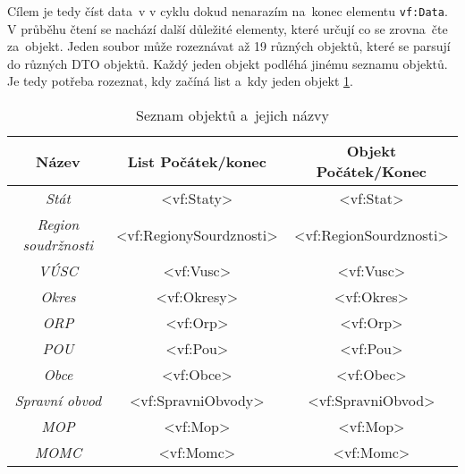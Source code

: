 Cílem je tedy číst data~v v cyklu dokud nenarazím na~konec elementu \texttt{vf:Data}.
V průběhu čtení se nachází další důležité elementy, které určují co se zrovna~čte za~objekt.
Jeden soubor může rozeznávat až 19 různých objektů, které se parsují do různých DTO objektů.
Každý jeden objekt podléhá jinému seznamu objektů.
Je tedy potřeba rozeznat, kdy začíná list a~kdy jeden objekt \ref{tab:seznamObjektu}.
\begin{table}[!h]
    \label{tab:seznamObjektu}
    \centering
    \caption{Seznam objektů a~jejich názvy}
    \begin{tabular}{|c|c|c|}
    \hline
    \textbf{Název}                       & \textbf{List Počátek/konec}                    & \textbf{Objekt Počátek/Konec}                 \\ \hline
    \textit{Stát}                        & \textless{}vf:Staty\textgreater{}              & \textless{}vf:Stat\textgreater{}              \\ \hline
    \textit{Region soudržnosti}          & \textless{}vf:RegionySourdznosti\textgreater{} & \textless{}vf:RegionSourdznosti\textgreater{} \\ \hline
    \textit{VÚSC}                        & \textless{}vf:Vusc\textgreater{}               & \textless{}vf:Vusc\textgreater{}              \\ \hline
    \textit{Okres}                       & \textless{}vf:Okresy\textgreater{}             & \textless{}vf:Okres\textgreater{}             \\ \hline
    \textit{ORP}                         & \textless{}vf:Orp\textgreater{}                & \textless{}vf:Orp\textgreater{}               \\ \hline
    \textit{POU}                         & \textless{}vf:Pou\textgreater{}                & \textless{}vf:Pou\textgreater{}               \\ \hline
    \textit{Obce}                        & \textless{}vf:Obce\textgreater{}               & \textless{}vf:Obec\textgreater{}              \\ \hline
    \textit{Spravní obvod}               & \textless{}vf:SpravniObvody\textgreater{}      & \textless{}vf:SpravniObvod\textgreater{}      \\ \hline
    \textit{MOP}                         & \textless{}vf:Mop\textgreater{}                & \textless{}vf:Mop\textgreater{}               \\ \hline
    \textit{MOMC}                        & \textless{}vf:Momc\textgreater{}               & \textless{}vf:Momc\textgreater{}              \\ \hline

\end{tabular}
\end{table}
